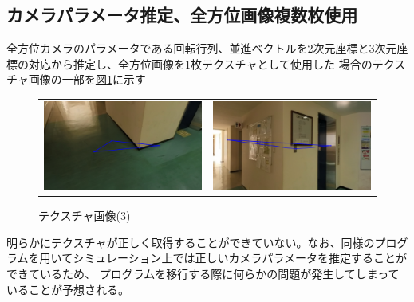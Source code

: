 \documentclass[]{jarticle}          %
\begin{document}
\subsection{カメラパラメータ推定、全方位画像複数枚使用}
全方位カメラのパラメータである回転行列、並進ベクトルを2次元座標と3次元座標の対応から推定し、全方位画像を1枚テクスチャとして使用した
場合のテクスチャ画像の一部を\hyperref[five]{図\ref{five}}に示す

\begin{figure}[H]
  \begin{center}
    \begin{tabular}{cc}
      \includegraphics[keepaspectratio, scale=0.1]{figures/texture3/texture/texture_0_0.png}&
      \includegraphics[keepaspectratio, scale=0.1]{figures/texture3/texture/texture_0_5.png}\\
    \end{tabular}
  \end{center}
  \caption{テクスチャ画像(3)}
  \label{five}
\end{figure}

明らかにテクスチャが正しく取得することができていない。なお、同様のプログラムを用いてシミュレーション上では正しいカメラパラメータを推定することができているため、
プログラムを移行する際に何らかの問題が発生してしまっていることが予想される。
\end{document}

